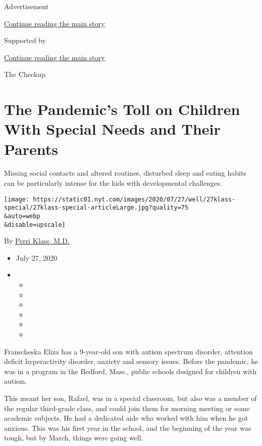 Advertisement

\protect\hyperlink{after-top}{Continue reading the main story}

Supported by

\protect\hyperlink{after-sponsor}{Continue reading the main story}

The Checkup

\hypertarget{the-pandemics-toll-on-children-with-special-needs-and-their-parents}{%
\section{The Pandemic's Toll on Children With Special Needs and Their
Parents}\label{the-pandemics-toll-on-children-with-special-needs-and-their-parents}}

Missing social contacts and altered routines, disturbed sleep and eating
habits can be particularly intense for the kids with developmental
challenges.

\texttt{[image: https://static01.nyt.com/images/2020/07/27/well/27klass-special/27klass-special-articleLarge.jpg?quality=75\\\&auto=webp\\\&disable=upscale]}

By \href{https://www.nytimes.com/by/perri-klass-md}{Perri Klass, M.D.}

\begin{itemize}
\item
  July 27, 2020
\item
  \begin{itemize}
  \item
  \item
  \item
  \item
  \item
  \item
  \end{itemize}
\end{itemize}

Franscheska Eliza has a 9-year-old son with autism spectrum disorder,
attention deficit hyperactivity disorder, anxiety and sensory issues.
Before the pandemic, he was in a program in the Bedford, Mass., public
schools designed for children with autism.

This meant her son, Rafael, was in a special classroom, but also was a
member of the regular third-grade class, and could join them for morning
meeting or some academic subjects. He had a dedicated aide who worked
with him when he got anxious. This was his first year in the school, and
the beginning of the year was tough, but by March, things were going
well.

